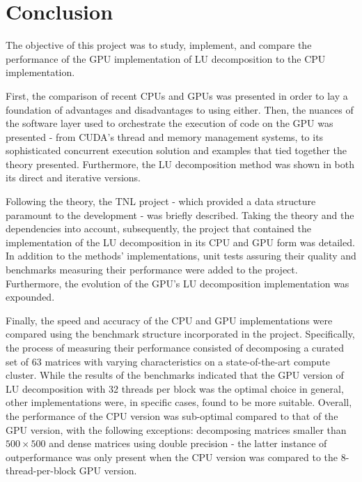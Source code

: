 \chapter*{Conclusion \TO}				   %

The objective of this project was to study, implement, and compare the performance of the GPU implementation of LU decomposition to the CPU implementation.
\par First, the comparison of recent CPUs and GPUs was presented in order to lay a foundation of advantages and disadvantages to using either. Then, the nuances of the software layer used to orchestrate the execution of code on the GPU was presented - from CUDA's thread and memory management systems, to its sophisticated concurrent execution solution and examples that tied together the theory presented. Furthermore, the LU decomposition method was shown in both its direct and iterative versions.
\par Following the theory, the TNL project - which provided a data structure paramount to the development - was briefly described. Taking the theory and the dependencies into account, subsequently, the project that contained the implementation of the LU decomposition in its CPU and GPU form was detailed. In addition to the methods' implementations, unit tests assuring their quality and benchmarks measuring their performance were added to the project. Furthermore, the evolution of the GPU's LU decomposition implementation was expounded.
\par Finally, the speed and accuracy of the CPU and GPU implementations were compared using the benchmark structure incorporated in the project. Specifically, the process of measuring their performance consisted of decomposing a curated set of $ 63 $ matrices with varying characteristics on a state-of-the-art compute cluster. While the results of the benchmarks indicated that the GPU version of LU decomposition with 32 threads per block was the optimal choice in general, other implementations were, in specific cases, found to be more suitable. Overall, the performance of the CPU version was sub-optimal compared to that of the GPU version, with the following exceptions: decomposing matrices smaller than $ 500\times 500 $ and dense matrices using double precision - the latter instance of outperformance was only present when the CPU version was compared to the 8-thread-per-block GPU version.
